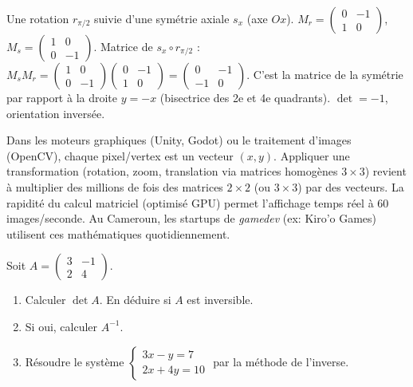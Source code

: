 \documentclass[11pt]{article}
\newcounter{popsec}
\newcounter{popsub}
\newcommand{\courssub}[1]{%
  \stepcounter{popsub}%
  \par\vspace{9pt}\noindent{\popxbold\fontsize{11.5}{13}\selectfont\color{popink}{\color{poporange}\thepopsec.\thepopsub}\hspace{6pt}#1}\par\nopagebreak\vspace{4pt}
}
\begin{document}
\begin{exemplebox}
Une rotation $r_{\pi/2}$ suivie d'une symétrie axiale $s_x$ (axe $Ox$).
$M_r = \begin{pmatrix} 0 & -1 \\ 1 & 0 \end{pmatrix}$, $M_s = \begin{pmatrix} 1 & 0 \\ 0 & -1 \end{pmatrix}$.
Matrice de $s_x \circ r_{\pi/2}$ : $M_s M_r = \begin{pmatrix} 1 & 0 \\ 0 & -1 \end{pmatrix}\begin{pmatrix} 0 & -1 \\ 1 & 0 \end{pmatrix} = \begin{pmatrix} 0 & -1 \\ -1 & 0 \end{pmatrix}$.
C'est la matrice de la symétrie par rapport à la droite $y=-x$ (bisectrice des 2e et 4e quadrants). $\det = -1$, orientation inversée.
\end{exemplebox}

\begin{savaistu}
Dans les moteurs graphiques (Unity, Godot) ou le traitement d'images (OpenCV), chaque pixel/vertex est un vecteur $(x,y)$. Appliquer une transformation (rotation, zoom, translation via matrices homogènes $3\times3$) revient à multiplier des millions de fois des matrices $2\times2$ (ou $3\times3$) par des vecteurs. La rapidité du calcul matriciel (optimisé GPU) permet l'affichage temps réel à 60 images/seconde. Au Cameroun, les startups de \emph{gamedev} (ex: Kiro'o Games) utilisent ces mathématiques quotidiennement.
\end{savaistu}

\courssub{Exercices types Bac}

\begin{exercice}
Soit $A = \begin{pmatrix} 3 & -1 \\ 2 & 4 \end{pmatrix}$.
\begin{enumerate}
  \item Calculer $\det A$. En déduire si $A$ est inversible.
  \item Si oui, calculer $A^{-1}$.
  \item Résoudre le système $\begin{cases} 3x - y = 7 \\ 2x + 4y = 10 \end{cases}$ par la méthode de l'inverse.
\end{enumerate}
\end{exercice}
\end{document}
